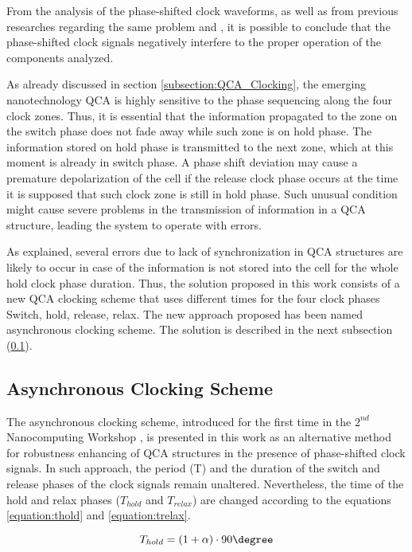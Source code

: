 From the analysis of the phase-shifted clock waveforms, as well as from previous researches regarding the same problem \cite{ottavi07} and \cite{karim09}, it is possible to conclude that the phase-shifted clock signals negatively interfere to the proper operation of the components analyzed.

As already discussed in section \ref{subsection:QCA_Clocking}, the emerging nanotechnology QCA is highly sensitive to the phase sequencing along the four clock zones. Thus, it is essential that the information propagated to the zone on the switch phase does not fade away while such zone is on hold phase. The information stored on hold phase is transmitted to the next zone, which at this moment is already in switch phase. A phase shift deviation may cause a premature depolarization of the cell if the release clock phase occurs at the time it is supposed that such clock zone is still in hold phase. Such unusual condition might cause severe problems in the transmission of information in a QCA structure, leading the system to operate with errors.

As explained, several errors due to lack of synchronization in QCA structures are likely to occur in case of the information is not stored into the cell for the whole hold clock phase duration. Thus, the solution proposed in this work consists of a new QCA clocking scheme that uses different times for the four clock phases \textemdash Switch, hold, release, relax. The new approach proposed has been named asynchronous clocking scheme. The solution is described in the next subsection (\ref{Asynchronous_Clocking_Scheme}).

\subsection{Asynchronous Clocking Scheme}
\label{Asynchronous_Clocking_Scheme}

The asynchronous clocking scheme, introduced for the first time in the $2^{nd}$ Nanocomputing Workshop \cite{reis15}, is presented in this work as an alternative method for robustness enhancing of QCA structures in the presence of phase-shifted clock signals. In such approach, the period (T) and the duration of the switch and release phases of the clock signals remain unaltered. Nevertheless, the time of the hold and relax phases ($T_{hold}$ and $T_{relax}$) are changed according to  the equations \ref{equation:thold} and \ref{equation:trelax}.

\begin{equation}
T_{hold} = (1+\alpha)\cdot90 \degree
\label{equation:thold}
\end{equation}

